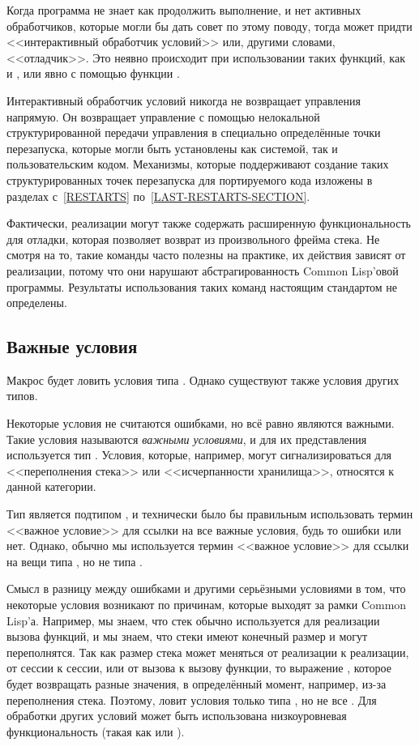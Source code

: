 Когда программа не знает как продолжить выполнение, и нет активных обработчиков,
которые могли бы дать совет по этому поводу, тогда может придти <<интерактивный
обработчик условий>> или, другими словами, <<отладчик>>. Это неявно происходит
при использовании таких функций, как  и , или явно с
помощью функции .

Интерактивный обработчик условий никогда не возвращает управления напрямую. Он
возвращает управление с помощью нелокальной структурированной передачи
управления в специально определённые точки перезапуска, которые могли быть
установлены как системой, так и пользовательским кодом. Механизмы, которые
поддерживают создание таких структурированных точек перезапуска для портируемого
кода изложены в разделах с~\ref{RESTARTS} по~\ref{LAST-RESTARTS-SECTION}.

Фактически, реализации могут также содержать расширенную функциональность для
отладки, которая позволяет возврат из произвольного фрейма стека. Не смотря на
то, такие команды часто полезны на практике, их действия зависят от
реализации, потому что они нарушают абстрагированность Common Lisp'овой
программы. Результаты использования таких команд настоящим стандартом не
определены.

\subsection{Важные условия}

Макрос  будет ловить условия типа . Однако
существуют также условия других типов.

Некоторые условия не считаются ошибками, но всё равно являются важными. Такие
условия называются \emph{важными условиями}, и для их представления используется
тип . Условия, которые, например, могут сигнализироваться
для <<переполнения стека>> или <<исчерпанности хранилища>>, относятся к данной
категории.

Тип  является подтипом , и технически было бы
правильным использовать термин <<важное условие>> для ссылки на все важные
условия, будь то ошибки или нет. Однако, обычно мы используется термин <<важное
условие>> для ссылки на вещи типа , но не типа
.

Смысл в разницу между ошибками и другими серьёзными условиями в том, что
некоторые условия возникают по причинам, которые выходят за рамки Common
Lisp'а. Например, мы знаем, что стек обычно используется для реализации вызова
функций, и мы знаем, что стеки имеют конечный размер и могут переполнятся. Так
как размер стека может меняться от реализации к реализации, от сессии к сессии,
или от вызова к вызову функции, то выражение ,
которое будет возвращать разные значения, в определённый момент, например, из-за
переполнения стека. Поэтому,  ловит условия только типа
, но не все . Для обработки других условий
может быть использована низкоуровневая функциональность (такая как
 или ).

